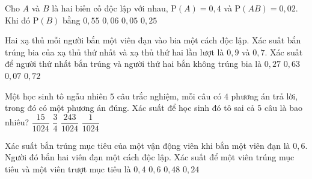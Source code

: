 \begin{ex}%
	Cho $A$ và $B$ là hai biến cố độc  lập với nhau, $\mathrm{P}(A)=0{,}4$ và $\mathrm{P}(AB)=0{,}02$. Khi đó $\mathrm{P}(B)$ bằng
	 \choice
		 {$0{,}55$}
		{$0{,}06$} 
		{\True $0{,}05$} 
		 {$0{,}25$}
\end{ex}

\begin{ex}%
	Hai xạ thủ mỗi người bắn một viên đạn vào bia một cách độc lập. Xác suất bắn trúng bia của xạ thủ thứ nhất và xạ thủ thứ hai lần lượt là $0{,}9$ và $0{,}7$. Xác suất để người thứ nhất bắn trúng và người  thứ hai bắn không trúng bia là
	 \choice
		 {\True $0{,}27$}
		 {$0{,}63$}
		{$0{,}07$} 
		 {$0{,}72$}
\end{ex}

\begin{ex}%
	Một học sinh tô ngẫu nhiên $5$ câu trắc nghiệm, mỗi câu có $4$ phương án trả lời, trong đó có một phương án đúng. Xác suất để học sinh đó tô sai cả $5$ câu là bao nhiêu? 
	\choice 
		{$\dfrac{15}{1024}$} 
		{$\dfrac{3}{4}$} 
		{\True $\dfrac{243}{1024}$} 
		 {$\dfrac{1}{1024}$}
\end{ex}

\begin{ex}%
	 Xác suất bắn trúng mục tiêu của một vận động viên khi bắn một viên đạn là $0{,}6$. Người đó bắn hai viên đạn một cách độc lập. Xác suất để một viên trúng mục tiêu và một viên trượt mục tiêu là
	 \choice
		{$0,4$} 
		 {$0,6$}
		{\True $0,48$} 
		 {$0,24$}
\end{ex}

